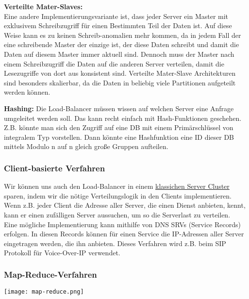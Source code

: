 \textbf{Verteilte Mater-Slaves:}\\
Eine andere Implementierungsvariante ist, dass jeder Server ein Master mit exklusivem Schreibzugriff für einen Bestimmten Teil der Daten ist. Auf diese Weise kann es zu keinen Schreib-anomalien mehr kommen, da in jedem Fall der eine schreibende Master der einzige ist, der diese Daten schreibt und damit die Daten auf diesem Master immer aktuell sind. Dennoch muss der Master nach einem Schreibzugriff die Daten auf die anderen Server verteilen, damit die Lesezugriffe von dort aus konsistent sind. Verteilte Mater-Slave Architekturen sind besonders skalierbar, da die Daten in beliebig viele Partitionen aufgeteilt werden können.

\textbf{Hashing:}
Die Load-Balancer müssen wissen auf welchen Server eine Anfrage umgeleitet werden soll. Das kann recht einfach mit Hash-Funktionen geschehen. Z.B. könnte man sich den Zugriff auf eine DB mit einem Primärschlüssel von integralem Typ vorstellen. Dann könnte eine Hashfunktion eine ID dieser DB mittels Modulo n auf n gleich große Gruppen aufteilen.



\subsubsection{Client-basierte Verfahren}
\label{client-based}

Wir können uns auch den Load-Balancer in einem \hyperref[sec:classic-server-cluster]{klassichen Server Cluster} sparen, indem wir die nötige Verteilungslogik in den Clients implementieren. Wenn z.B. jeder Client die Adresse aller Server, die einen Dienst anbieten, kennt, kann er einen zufälligen Server aussuchen, um so die Serverlast zu verteilen.\\
Eine mögliche Implementierung kann mithilfe von DNS SRVs (Service Records) erfolgen. In diesen Records können für einen Service die IP-Adressen aller Server eingetragen werden, die ihn anbieten. Dieses Verfahren wird z.B. beim SIP Protokoll für Voice-Over-IP verwendet.

\subsubsection{Map-Reduce-Verfahren}
\label{sec:map-reduce}

\texttt{[image: map-reduce.png]}

